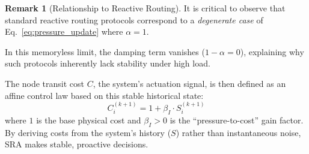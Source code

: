 \documentclass[journal]{IEEEtran}
\theoremstyle{plain}
\theoremstyle{definition}
\newtheorem{remark}{Remark}
\begin{document}
\begin{remark}[Relationship to Reactive Routing]
\label{rem:reactive_routing}
It is critical to observe that standard reactive routing protocols correspond to a \textit{degenerate case} of Eq.~\eqref{eq:pressure_update} where $\alpha=1$. 
\end{remark}

In this memoryless limit, the damping term vanishes ($1-\alpha=0$), explaining why such protocols inherently lack stability under high load.

The node transit cost $C$, the system's actuation signal, is then defined as an affine control law based on this stable historical state:
\begin{equation}
    \label{eq:cost_update}
    C_i^{(k+1)} = 1 + \beta_I \cdot S_i^{(k+1)}
\end{equation}
where $1$ is the base physical cost and $\beta_I > 0$ is the ``pressure-to-cost'' gain factor. 
By deriving costs from the system's history ($S$) rather than instantaneous noise, SRA makes stable, proactive decisions.
\end{document}
